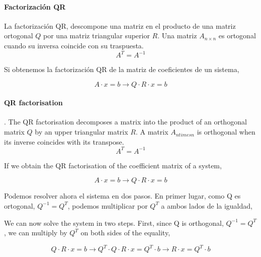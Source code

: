 \begin{paracol}{2}
\paragraph{Factorización QR} La factorización QR, descompone una matriz en el producto de una matriz ortogonal $Q$  por una matriz triangular superior $R$.  Una matriz $A_{n\times n}$ es ortogonal cuando su inversa coincide con su traspuesta.
\begin{equation*}
A^T=A^{-1}
\end{equation*}

Si obtenemos la factorización QR de la matriz de coeficientes de un sistema,

\begin{equation*}
A\cdot x=b \rightarrow Q\cdot R\cdot x =b
\end{equation*}

\switchcolumn
\paragraph{QR factorisation}. The QR factorisation decomposes a matrix into the product of an orthogonal matrix $Q$ by an upper triangular matrix $R$.  A matrix $A_{ntimes n}$ is orthogonal when its inverse coincides with its transpose.
\begin{equation*}
A^T=A^{-1}
\end{equation*}

If we obtain the QR factorisation of the coefficient matrix of a system,

\begin{equation*}
A\cdot x=b \rightarrow Q\cdot R\cdot x =b
\end{equation*}

\switchcolumn

Podemos resolver ahora el sistema en dos pasos. En primer lugar, como Q es ortogonal, $Q^{-1}=Q^T$, podemos multiplicar por $Q^T$ a ambos lados de la igualdad,

\switchcolumn
We can now solve the system in two steps. First, since Q is orthogonal, $Q^{-1}=Q^T$, we can multiply by $Q^T$ on both sides of the equality,

\end{paracol}
 
\begin{equation*}
Q\cdot R\cdot x =b \rightarrow Q^T\cdot Q\cdot R\cdot x = Q^T \cdot b \rightarrow R\cdot x= Q^T\cdot b
\end{equation*}

